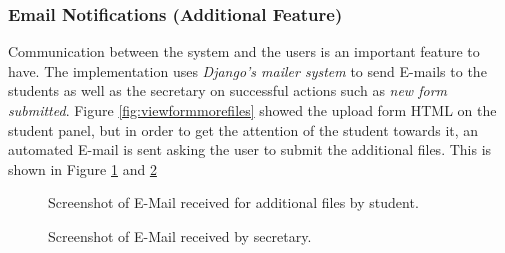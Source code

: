 \documentclass[../main.tex]{subfiles}
\begin{document}
\subsubsection{Email Notifications (Additional Feature)}
Communication between the system and the users is an important feature to have. The implementation uses \textit{Django's mailer system} to send E-mails to the students as well as the secretary on successful actions such as \emph{new form submitted}. Figure \ref{fig:viewformmorefiles} showed the upload form HTML on the student panel, but in order to get the attention of the student towards it, an automated E-mail is sent asking the user to submit the additional files. This is shown in Figure \ref{fig:emailuploadfiles} and \ref{fig:newformsub}

\begin{figure}[H]
        \caption{\label{fig:emailuploadfiles} Screenshot of E-Mail received for additional files by student.}
      \end{figure}

\begin{figure}[H]
        \caption{\label{fig:newformsub} Screenshot of E-Mail received by secretary.}
      \end{figure}
\end{document}
